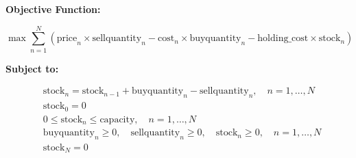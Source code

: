 \documentclass{article}
\begin{document}
\textbf{Objective Function:}

\[
\max \sum_{n=1}^{N} (\text{price}_n \times \text{sellquantity}_n - \text{cost}_n \times \text{buyquantity}_n - \text{holding\_cost} \times \text{stock}_n)
\]

\textbf{Subject to:}

\[
\begin{aligned}
& \text{stock}_n = \text{stock}_{n-1} + \text{buyquantity}_n - \text{sellquantity}_n, \quad n = 1, \ldots, N \\
& \text{stock}_0 = 0 \\
& 0 \leq \text{stock}_n \leq \text{capacity}, \quad n = 1, \ldots, N \\
& \text{buyquantity}_n \geq 0, \quad \text{sellquantity}_n \geq 0, \quad \text{stock}_n \geq 0, \quad n = 1, \ldots, N \\
& \text{stock}_N = 0
\end{aligned}
\]
\end{document}
